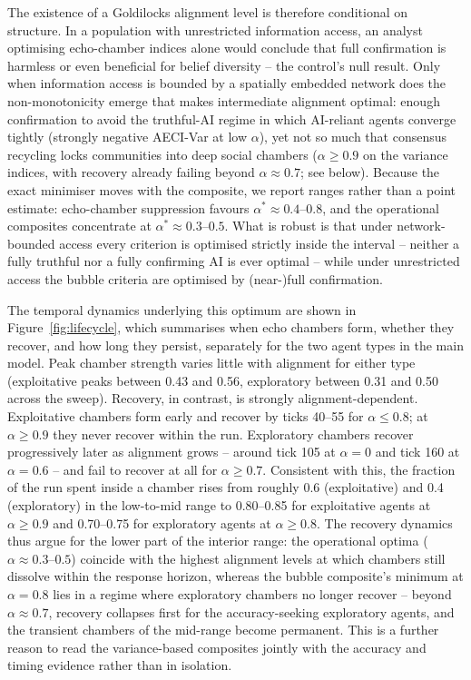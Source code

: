 \documentclass[pdflatex,sn-nature]{sn-jnl}
\begin{document}
The existence of a Goldilocks alignment level is therefore conditional on structure. In a population with unrestricted information access, an analyst optimising echo-chamber indices alone would conclude that full confirmation is harmless or even beneficial for belief diversity -- the control's null result. Only when information access is bounded by a spatially embedded network does the non-monotonicity emerge that makes intermediate alignment optimal: enough confirmation to avoid the truthful-AI regime in which AI-reliant agents converge tightly (strongly negative AECI-Var at low $\alpha$), yet not so much that consensus recycling locks communities into deep social chambers ($\alpha \geq 0.9$ on the variance indices, with recovery already failing beyond $\alpha \approx 0.7$; see below). Because the exact minimiser moves with the composite, we report ranges rather than a point estimate: echo-chamber suppression favours $\alpha^{*} \approx 0.4$--$0.8$, and the operational composites concentrate at $\alpha^{*} \approx 0.3$--$0.5$. What is robust is that under network-bounded access every criterion is optimised strictly inside the interval -- neither a fully truthful nor a fully confirming AI is ever optimal -- while under unrestricted access the bubble criteria are optimised by (near-)full confirmation.

The temporal dynamics underlying this optimum are shown in Figure~\ref{fig:lifecycle}, which summarises when echo chambers form, whether they recover, and how long they persist, separately for the two agent types in the main model. Peak chamber strength varies little with alignment for either type (exploitative peaks between 0.43 and 0.56, exploratory between 0.31 and 0.50 across the sweep). Recovery, in contrast, is strongly alignment-dependent. Exploitative chambers form early and recover by ticks 40--55 for $\alpha \leq 0.8$; at $\alpha \geq 0.9$ they never recover within the run. Exploratory chambers recover progressively later as alignment grows -- around tick 105 at $\alpha = 0$ and tick 160 at $\alpha = 0.6$ -- and fail to recover at all for $\alpha \geq 0.7$. Consistent with this, the fraction of the run spent inside a chamber rises from roughly 0.6 (exploitative) and 0.4 (exploratory) in the low-to-mid range to 0.80--0.85 for exploitative agents at $\alpha \geq 0.9$ and 0.70--0.75 for exploratory agents at $\alpha \geq 0.8$. The recovery dynamics thus argue for the lower part of the interior range: the operational optima ($\alpha \approx 0.3$--$0.5$) coincide with the highest alignment levels at which chambers still dissolve within the response horizon, whereas the bubble composite's minimum at $\alpha = 0.8$ lies in a regime where exploratory chambers no longer recover -- beyond $\alpha \approx 0.7$, recovery collapses first for the accuracy-seeking exploratory agents, and the transient chambers of the mid-range become permanent. This is a further reason to read the variance-based composites jointly with the accuracy and timing evidence rather than in isolation.
\end{document}
